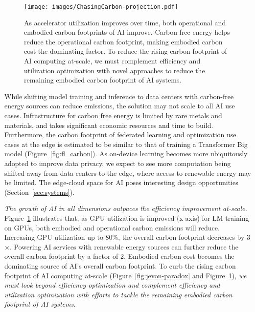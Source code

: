 \begin{figure}[t]
    \centering
    \texttt{[image: images/ChasingCarbon-projection.pdf]}
    \vspace{-0.5cm}
    \caption{As accelerator utilization improves over time, both operational and embodied carbon footprints of AI improve. Carbon-free energy helps reduce the operational carbon footprint, making embodied carbon cost the dominating factor. 
    To reduce the rising carbon footprint of AI computing at-scale, we must complement efficiency and utilization optimization with novel approaches to reduce the remaining embodied carbon footprint of AI systems.}
    \label{figure:server-utilization}
    \vspace{-0.25cm}
\end{figure}
While shifting model training and inference to data centers with carbon-free energy sources can reduce emissions, the solution may not scale to all AI use cases.
Infrastructure for carbon free energy is limited by rare metals and materials, and takes significant economic resources and time to build. 
Furthermore, the carbon footprint of federated learning and optimization use cases at the edge is estimated to be similar to that of training a Transformer Big model (Figure~\ref{fig:fl_carbon}). As on-device learning becomes more ubiquitously adopted to improve data privacy, we expect to see more computation being shifted away from data centers to the edge, where access to renewable energy may be limited. The edge-cloud space for AI poses interesting design opportunities (Section~\ref{sec:systems}). 


\textit{The growth of AI in all dimensions outpaces the efficiency improvement at-scale.}
Figure~\ref{figure:server-utilization} illustrates that, as GPU utilization is improved (x-axis) for LM training on GPUs, both embodied and operational carbon emissions will reduce. Increasing GPU utilization up to 80\%, the overall carbon footprint decreases by 3$\times$. 
Powering AI services with renewable energy sources 
can further reduce the overall carbon footprint by a factor of 2. Embodied carbon cost becomes the dominating source of AI's overall carbon footprint. To curb the rising carbon footprint of AI computing at-scale (Figure~\ref{fig:jevon-paradox} and Figure~\ref{figure:server-utilization}), \textit{we must look beyond efficiency optimization and complement efficiency and utilization optimization with efforts to tackle the remaining embodied carbon footprint of AI systems.}

